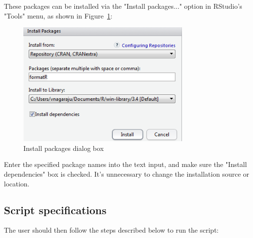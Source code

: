 \documentclass[conference]{IEEEtran}
\begin{document}
\begin{itemize}
{{        } 
        \item {These packages can be installed via the "Install packages..." option in RStudio's "Tools" menu, as shown in Figure~\ref{fig:InstallPackages}:
        \begin{figure}[!h]
        \centering
        \includegraphics[width=3.4in]{Figures/InstallPackages}
        \caption{Install packages dialog box}
        \label{fig:InstallPackages}
        \end{figure}

        \noindent Enter the specified package names into the text input, and make sure the "Install dependencies" box is checked. It's unnecessary to change the installation source or location.}
      }
\end{itemize}

\subsection{Script specifications}\label{sec:ScriptRun}
The user should then follow the steps described below to run the script:
\end{document}
